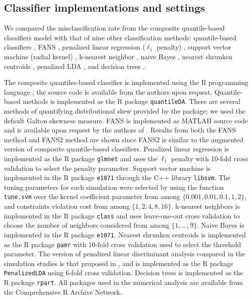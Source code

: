 \documentclass{article}
\def\r/{\textsf{R}}
\def\matlab/{\textsf{MATLAB}}
\begin{document}
\subsection{Classifier implementations and settings}
\label{sec:classifier-implementations}

We compared the misclassification rate from the composite quantile-based
classifiers model with that of nine other classification methods: quantile-based
classifiers \cite{hennig2016}, FANS \cite{fan2016}, penalized linear regression
($\ell_1$ penalty) \cite{park2007}, support vector machine (radial kernel)
\cite{cortes1995}, k-nearest neighbor \cite{cover1967}, naive Bayes
\cite{hastie2009}, nearest shrunken centroids \cite{tibshirani2002}, penalized
LDA \cite{witten2011}, and decision trees \cite{breiman1984}.  

The composite quantiles-based classifier is implemented using the \r/
programming language \cite{rlang}; the source code is available from the authors
upon request.  Quantile-based methods is implemented as the \r/ package
\texttt{quantileDA}.  There are several methods of quantifying distributional
skew provided by the package; we used the default Galton skewness measure.  FANS
is implemented as \matlab/ \cite{matlab} source code and is available upon
request by the authors of \cite{fan2016}.  Results from both the FANS method and
FANS2 method are shown since FANS2 is similar to the augmented version of
composite quantile-based classifiers.  Penalized linear regression is
implemented as the \r/ package \texttt{glmnet} and uses the $\ell_1$ penalty
with 10-fold cross validation to select the penalty parameter.  Support vector
machine is implemented in the \r/ package \texttt{e1071} through the C++ library
\texttt{libsvm}.  The tuning parameters for each simulation were selected by
using the function \texttt{tune.svm} over the kernel coefficient parameter from
among $\{0.001, 0.01, 0.1, 1, 2\}$, and constraints violation cost from among
$\{1, 2, 4, 8, 16\}$.  k-nearest neighbors is implemented in the \r/ package
\texttt{class} and uses leave-one-out cross validation to choose the number of
neighbors considered from among $\{1, \dots, 9\}$.  Naive Bayes is implemented
in the \r/ package \texttt{e1071}.  Nearest shrunken centroids is implemented as
the \r/ package \texttt{pamr} with 10-fold cross validation used to select the
threshold parameter.  The version of penalized linear discriminant analysis
compared in the simulation studies is that proposed in \cite{witten2011}, and is
implemented as the \r/ package \texttt{PenalizedLDA} using 6-fold cross
validation.  Decision trees is implemented as the \r/ package \texttt{rpart}.
All packages used in the numerical analysis are available from the Comprehensive
\r/ Archive Network.
\end{document}
